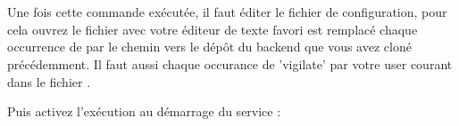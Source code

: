 \\
\\
\\
\\
\\
\\
\\
Une fois cette commande exécutée, il faut éditer le fichier de configuration, pour cela ouvrez le fichier  avec votre éditeur de texte favori est remplacé chaque occurrence de  par le chemin vers le dépôt du backend que vous avez cloné précédemment.\newline
Il faut aussi chaque occurance de 'vigilate' par votre user courant dans le fichier .

Puis activez l’exécution au démarrage du service :

